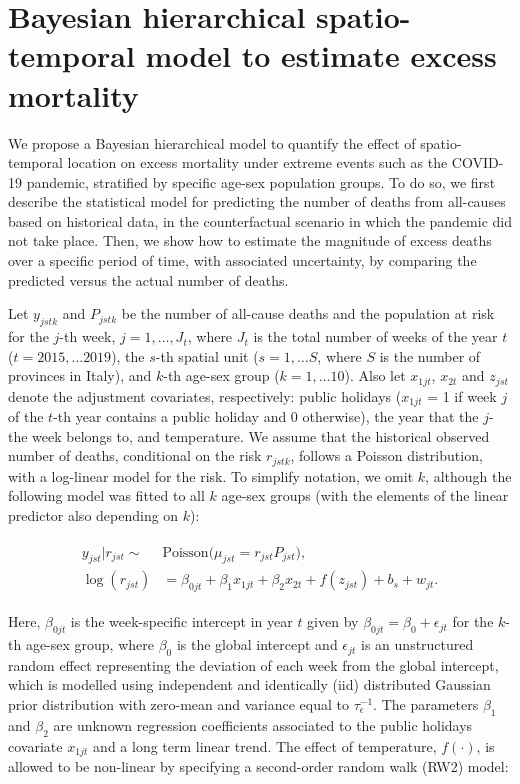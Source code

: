 \section{Bayesian hierarchical spatio-temporal model to estimate excess mortality}


We propose a Bayesian hierarchical model to quantify the effect of spatio-temporal location on excess mortality under extreme events such as the COVID-19 pandemic, stratified by specific age-sex population groups. To do so, we first describe the statistical model for predicting the number of deaths from all-causes based on historical data, in the counterfactual scenario in which the pandemic did not take place. Then, we show how to estimate the magnitude of excess deaths over a specific period of time, with associated uncertainty, by comparing the predicted versus the actual number of deaths.

Let $y_{jstk}$ and $P_{jstk}$ be the number of all-cause deaths and the population at risk for the $j$-th week, $j=1, \dots, J_t$, where $J_t$ is the total number of weeks of the year $t$ ($t=2015, \dots 2019$), the $s$-th spatial unit ($s=1, \dots S$, where $S$ is the number of provinces in Italy), and $k$-th age-sex group ($k = 1, \dots 10$). Also let $x_{1jt}$, $x_{2t}$ and $z_{jst}$ denote the adjustment covariates, respectively: public holidays ($x_{1jt}$ = 1 if week $j$ of the $t$-th year contains a public holiday and 0 otherwise), the year that the $j$-the week belongs to, and temperature. We assume that the historical observed number of deaths, conditional on the risk $r_{jstk}$, follows a Poisson distribution, with a log-linear model for the risk. To simplify notation, we omit $k$, although the following model was fitted to all $k$ age-sex groups (with the elements of the linear predictor also depending on $k$):

\begin{align} \label{eq:1}
\begin{split}
y_{jst}|r_{jst} \sim & \text{Poisson}\big(\mu_{jst}=r_{jst}P_{jst}\big),  \\
\log \left(r_{jst} \right) & = \beta_{0jt} + \beta_{1} x_{1jt} + \beta_{2} x_{2t} + f(z_{jst}) + b_{s} + w_{jt}.
\end{split}
\end{align}

Here, $\beta_{0jt}$ is the week-specific intercept in year $t$ given by $\beta_{0jt}=\beta_{0}+\epsilon_{jt}$ for the $k$-th age-sex group, where $\beta_{0}$ is the global intercept and $\epsilon_{jt}$ is an unstructured random effect representing the deviation of each week from the global intercept, which is modelled using independent and identically (iid) distributed Gaussian prior distribution with zero-mean and variance equal to $\tau_\epsilon^{-1}$. The parameters $\beta_1$ and $\beta_2$ are  unknown regression coefficients associated to the public holidays covariate $x_{1jt}$ and a long term linear trend. The effect of temperature, $f(\cdot)$, is allowed to be non-linear by specifying  a second-order random walk (RW2) model:


